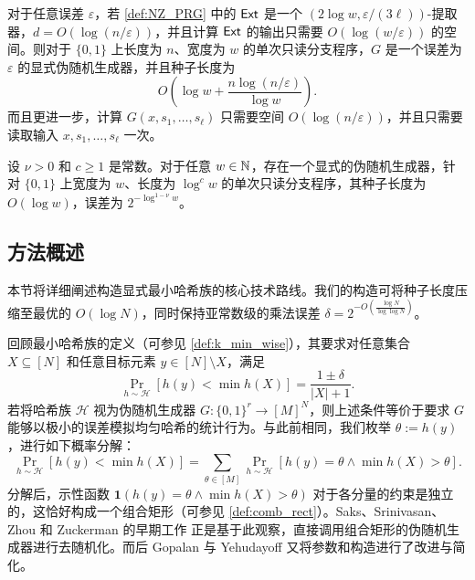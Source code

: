\begin{lemma}
    对于任意误差 $\varepsilon$，若 \cref{def:NZ_PRG} 中的 $\mathsf{Ext}$ 是一个 $(2 \log w, \varepsilon / (3 \ell))$-提取器，$d = O(\log (n / \varepsilon))$，并且计算 $\mathsf{Ext}$ 的输出只需要 $O(\log (w / \varepsilon))$ 的空间。则对于 $\{0, 1\}$ 上长度为 $n$、宽度为 $w$ 的单次只读分支程序，$G$ 是一个误差为 $\varepsilon$ 的显式伪随机生成器，并且种子长度为
    $$
    O\left( \log w + \frac{n \log (n / \varepsilon)}{\log w} \right).
    $$
    而且更进一步，计算 $G(x, s_1, \ldots, s_\ell)$ 只需要空间 $O(\log (n / \varepsilon))$，并且只需要读取输入 $x, s_1, \ldots, s_\ell$ 一次。
\end{lemma}

\begin{theorem}
    设 $\nu > 0$ 和 $c \ge 1$ 是常数。对于任意 $w \in \mathbb{N}$，存在一个显式的伪随机生成器，针对 $\{0, 1\}$ 上宽度为 $w$、长度为 $\log^c w$ 的单次只读分支程序，其种子长度为 $O(\log w)$，误差为 $2^{-\log^{1 - \nu} w}$。
\end{theorem}

\subsection{方法概述}\label{sec:overview}

本节将详细阐述构造显式最小哈希族的核心技术路线。我们的构造可将种子长度压缩至最优的 $O(\log N)$，同时保持亚常数级的乘法误差 $\delta = 2^{-O\left(\frac{\log N}{\log \log N}\right)}$。

回顾最小哈希族的定义（可参见 \cref{def:k_min_wise}），其要求对任意集合 $X \subseteq [N]$ 和任意目标元素 $y \in [N] \setminus X$，满足
$$
\Pr_{h \sim \mathcal{H}}[h(y) < \min h(X)] = \frac{1 \pm \delta}{|X| + 1}.
$$
若将哈希族 $\mathcal{H}$ 视为伪随机生成器 $G: \{0,1\}^r \to [M]^N$，则上述条件等价于要求 $G$ 能够以极小的误差模拟均匀哈希的统计行为。与此前相同，我们枚举 $\theta := h(y)$，进行如下概率分解：
\begin{equation}\label{eq:overview_decomp}
\Pr_{h \sim \mathcal{H}}[h(y) < \min h(X)] = \sum_{\theta \in [M]} \Pr_{h \sim \mathcal{H}}[h(y) = \theta \wedge \min h(X) > \theta].
\end{equation}
分解后，示性函数 $\mathbf{1}(h(y) = \theta \wedge \min h(X) > \theta)$ 对于各分量的约束是独立的，这恰好构成一个组合矩形（可参见 \cref{def:comb_rect}）。Saks、Srinivasan、Zhou 和 Zuckerman 的早期工作 \cite{SSZZ00_connection_CR_min_wise} 正是基于此观察，直接调用组合矩形的伪随机生成器进行去随机化。而后 Gopalan 与 Yehudayoff \cite{GY20_PRG_CR_SOTA} 又将参数和构造进行了改进与简化。

